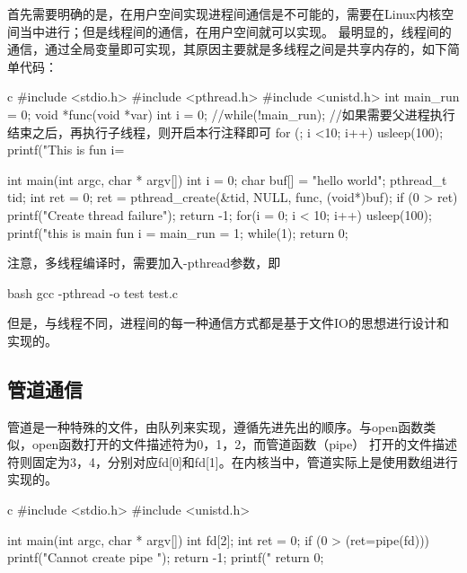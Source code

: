 首先需要明确的是，在用户空间实现进程间通信是不可能的，需要在Linux内核空间当中进行；但是线程间的通信，在用户空间就可以实现。
最明显的，线程间的通信，通过全局变量即可实现，其原因主要就是多线程之间是共享内存的，如下简单代码：
\begin{code-block}{c}
#include <stdio.h>
#include <pthread.h>
#include <unistd.h>
int main_run = 0;
void *func(void *var)
{
        int i = 0;
        //while(!main_run); //如果需要父进程执行结束之后，再执行子线程，则开启本行注释即可
        for (; i <10; i++)
        {
                usleep(100);
                printf("This is fun i=%
        }
}

int main(int argc, char * argv[])
{
        int i = 0;
        char buf[] = "hello world\n";
        pthread_t tid;
        int ret = 0;
        ret = pthread_create(&tid, NULL, func, (void*)buf);
        if (0 > ret)
        {
                printf("Create thread failure\n");
                return -1;
        }
        for(i = 0; i < 10; i++)
        {
                usleep(100);
                printf("this is main fun i = %
        }
        main_run = 1;
        while(1);
        return 0;
}
\end{code-block}

注意，多线程编译时，需要加入-pthread参数，即
\begin{code-block}{bash}
gcc -pthread -o test test.c
\end{code-block}

但是，与线程不同，进程间的每一种通信方式都是基于文件IO的思想进行设计和实现的。

\subsection{管道通信}
管道是一种特殊的文件，由队列来实现，遵循先进先出的顺序。与open函数类似，open函数打开的文件描述符为0，1，2，而管道函数（pipe）
打开的文件描述符则固定为3，4，分别对应fd[0]和fd[1]。在内核当中，管道实际上是使用数组进行实现的。
\begin{code-block}{c}
#include <stdio.h>
#include <unistd.h>

int main(int argc, char * argv[])
{
        int fd[2];
        int ret = 0;
        if (0 > (ret=pipe(fd)))
        {
                printf("Cannot create pipe \n");
                return -1;
        }
        printf("%
        return 0;
}
\end{code-block}

